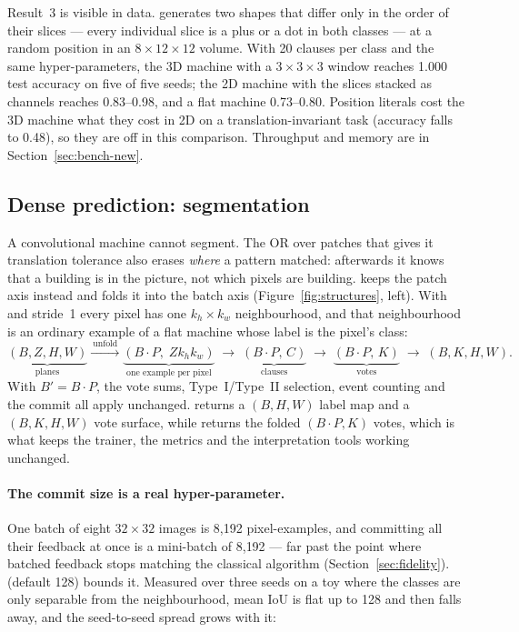 Result~3 is visible in data.  generates two shapes that differ
only in the order of their slices --- every individual slice is a plus or a dot in both
classes --- at a random position in an $8\times12\times12$ volume. With 20 clauses per class
and the same hyper-parameters, the 3D machine with a $3\times3\times3$ window reaches 1.000
test accuracy on five of five seeds; the 2D machine with the slices stacked as channels
reaches 0.83--0.98, and a flat machine 0.73--0.80. Position literals cost the 3D machine
what they cost in 2D on a translation-invariant task (accuracy falls to 0.48), so they are
off in this comparison. Throughput and memory are in Section~\ref{sec:bench-new}.

\subsection{Dense prediction: segmentation}
\label{sec:segmentation}

A convolutional machine cannot segment. The OR over patches that gives it translation
tolerance also erases \emph{where} a pattern matched: afterwards it knows that a building is
in the picture, not which pixels are building.  keeps the
patch axis instead and folds it into the batch axis
(Figure~\ref{fig:structures}, left). With  and stride~1 every pixel has
one $k_h\times k_w$ neighbourhood, and that neighbourhood is an ordinary example of a flat
machine whose label is the pixel's class:
\[
  \underbrace{(B, Z, H, W)}_{\text{planes}} \xrightarrow{\ \text{unfold}\ }
  \underbrace{(B\cdot P,\; Zk_hk_w)}_{\text{one example per pixel}}
  \;\to\; \underbrace{(B\cdot P,\, C)}_{\text{clauses}}
  \;\to\; \underbrace{(B\cdot P,\, K)}_{\text{votes}} \;\to\; (B, K, H, W).
\]
With $B' = B\cdot P$, the vote sums, Type~I\slash Type~II selection, event counting and the
commit all apply unchanged.  returns a $(B,H,W)$ label map and 
a $(B,K,H,W)$ vote surface, while  returns the folded $(B\cdot P, K)$ votes,
which is what keeps the trainer, the metrics and the interpretation tools working unchanged.

\paragraph{The commit size is a real hyper-parameter.}
One batch of eight $32\times32$ images is 8{,}192 pixel-examples, and committing all their
feedback at once is a mini-batch of 8{,}192 --- far past the point where batched feedback
stops matching the classical algorithm (Section~\ref{sec:fidelity}).
 (default 128) bounds it. Measured over three seeds on a toy
where the classes are only separable from the neighbourhood, mean IoU is flat up to 128 and
then falls away, and the seed-to-seed spread grows with it:

